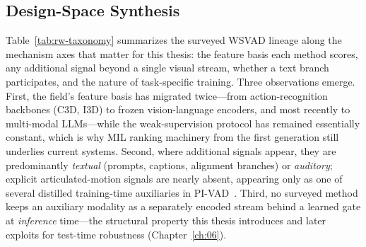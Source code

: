 \subsection{Design-Space Synthesis}

Table~\ref{tab:rw-taxonomy} summarizes the surveyed WSVAD lineage along the mechanism axes that
matter for this thesis: the feature basis each method scores, any additional signal beyond a
single visual stream, whether a text branch participates, and the nature of task-specific
training. Three observations emerge. First, the field's feature basis has migrated twice---from
action-recognition backbones (C3D, I3D) to frozen vision-language encoders, and most recently to
multi-modal LLMs---while the weak-supervision protocol has remained essentially constant, which
is why MIL ranking machinery from the first generation still underlies current systems. Second,
where additional signals appear, they are predominantly \emph{textual} (prompts, captions,
alignment branches) or \emph{auditory}; explicit articulated-motion signals are nearly absent,
appearing only as one of several distilled training-time auxiliaries in
PI-VAD~\cite{majhi2025pivad}. Third, no surveyed method keeps an auxiliary modality as a
separately encoded stream behind a learned gate at \emph{inference} time---the structural
property this thesis introduces and later exploits for test-time robustness
(Chapter~\ref{ch:06}).

